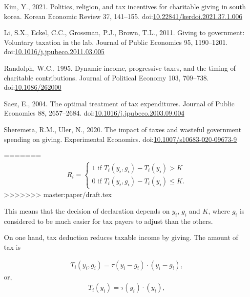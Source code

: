 \documentclass[
  11pt,
  a4paper,
]{article}
\newlength{\cslhangindent}
\newlength{\cslentryspacingunit} %
\newenvironment{CSLReferences}[2] %
 {%
  \setlength{\parindent}{0pt}
  \ifodd #1
  \let\oldpar\par
  \def\par{\hangindent=\cslhangindent\oldpar}
  \fi
  \setlength{\parskip}{#2\cslentryspacingunit}
 }%
 {}
\newlength{\cslhangindent}
\newenvironment{CSLReferences}[2] %
 {%
  \setlength{\parindent}{0pt}
  \ifodd #1 \everypar{\setlength{\hangindent}{\cslhangindent}}\ignorespaces\fi
  \ifnum #2 > 0
  \setlength{\parskip}{#2\baselineskip}
  \fi
 }%
 {}
\begin{document}
\begin{CSLReferences}{1}{0}
  \leavevmode{}%
  Kim, Y., 2021. Politics, religion, and tax incentives for charitable giving in south korea. Korean Economic Review 37, 141--155. doi:\href{https://doi.org/10.22841/kerdoi.2021.37.1.006}{10.22841/kerdoi.2021.37.1.006}

  \leavevmode{}%
  Li, S.X., Eckel, C.C., Grossman, P.J., Brown, T.L., 2011. Giving to government: Voluntary taxation in the lab. Journal of Public Economics 95, 1190--1201. doi:\href{https://doi.org/10.1016/j.jpubeco.2011.03.005}{10.1016/j.jpubeco.2011.03.005}

  \leavevmode{}%
  Randolph, W.C., 1995. Dynamic income, progressive taxes, and the timing of charitable contributions. Journal of Political Economy 103, 709--738. doi:\href{https://doi.org/10.1086/262000}{10.1086/262000}

  \leavevmode{}%
  Saez, E., 2004. The optimal treatment of tax expenditures. Journal of Public Economics 88, 2657--2684. doi:\href{https://doi.org/10.1016/j.jpubeco.2003.09.004}{10.1016/j.jpubeco.2003.09.004}

  \leavevmode{}%
  Sheremeta, R.M., Uler, N., 2020. The impact of taxes and wasteful government spending on giving. Experimental Economics. doi:\href{https://doi.org/10.1007/s10683-020-09673-9}{10.1007/s10683-020-09673-9}

  \end{CSLReferences}
=======
\begin{align}
R_i=\begin{cases}
1 \text{ if }T_i(y_i, g_i) - T_i(y_i)>K\\
0 \text{ if }T_i(y_i, g_i) - T_i(y_i)\le K.
\end{cases}
\end{align}
>>>>>>> master:paper/draft.tex

This means that the decision of declaration depends on \(y_i\), \(g_i\) and \(K\), where \(g_i\) is considered to be much easier for tax payers to adjust than the others.

On one hand, tax deduction reduces taxable income by giving. The amount of tax is

\begin{align}
    T_i(y_i, g_i) = \tau(y_i - g_i) \cdot (y_i - g_i),
\end{align}
or,
\begin{align}
    T_i(y_i) = \tau(y_i) \cdot (y_i),
\end{align}
\end{document}
